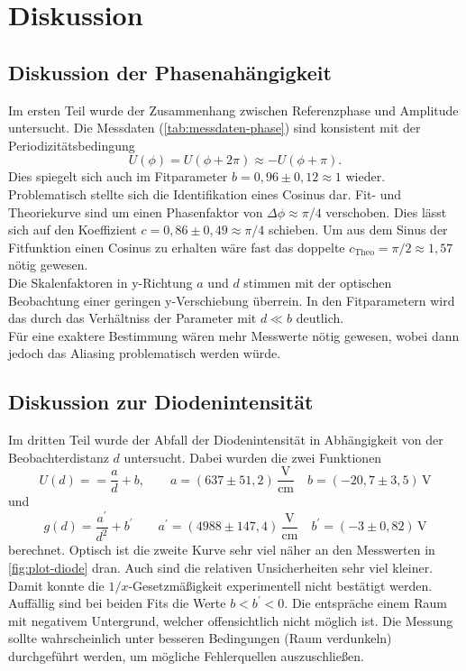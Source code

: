 \section{Diskussion}
\label{sec:Diskussion}

\subsection{Diskussion der Phasenahängigkeit}
\label{sec:Diskussion der Phasenahängigkeit}
Im ersten Teil wurde der Zusammenhang zwischen Referenzphase und Amplitude untersucht. Die
Messdaten (\autoref{tab:messdaten-phase}) sind konsistent mit der Periodizitätsbedingung
\begin{equation}
	U(\phi) = U(\phi + 2\pi) \approx -U(\phi + \pi).
\end{equation}
Dies spiegelt sich auch im Fitparameter $b = 0,96\pm0,12 \approx 1$ wieder. Problematisch
stellte sich die Identifikation eines Cosinus dar. Fit- und Theoriekurve sind um einen
Phasenfaktor von $\Delta \phi \approx \pi/4$ verschoben. Dies lässt sich auf den
Koeffizient $c = 0,86 \pm 0,49 \approx \pi / 4$ schieben. Um aus dem Sinus der
Fitfunktion einen Cosinus zu erhalten wäre fast das doppelte $c_\text{Theo} = \pi/2 \approx
1,57$ nötig gewesen.
\\
Die Skalenfaktoren in y-Richtung $a$ und $d$ stimmen mit der optischen Beobachtung einer
geringen y-Verschiebung überrein. In den Fitparametern wird das durch das
Verhältniss der Parameter mit $d \ll b$ deutlich.
\\
Für eine exaktere Bestimmung wären mehr Messwerte nötig gewesen, wobei dann jedoch das
Aliasing problematisch werden würde.

\subsection{Diskussion zur Diodenintensität}
\label{sec:Diskussion zur Diodenintensität}
Im dritten Teil wurde der Abfall der Diodenintensität in Abhängigkeit von der
Beobachterdistanz $d$ untersucht. Dabei wurden die zwei Funktionen
\begin{equation}
	U(d) = = \frac{a}{d} + b,
	\qquad
	a = (637 \pm 51,2) \, \frac{\si{\volt}}{\si{\centi\meter}}
	\quad
	b = (-20,7 \pm 3,5) \, \si{\volt}
\end{equation}
und 
\begin{equation}
	g(d) = \frac{a^\prime}{d^2} + b^\prime
	\qquad
	a^\prime = (4988 \pm 147,4) \, \frac{\si{\volt}}{\si{\centi\meter}}
	\quad
	b^\prime = (-3 \pm 0,82) \, \si{\volt}
\end{equation}
berechnet. Optisch ist die zweite Kurve sehr viel näher an den Messwerten in
\autoref{fig:plot-diode} dran. Auch sind die relativen Unsicherheiten sehr viel kleiner.
Damit konnte die $1/x$-Gesetzmäßigkeit experimentell nicht bestätigt werden.
\\
Auffällig sind bei beiden Fits die Werte $b < b^\prime < 0$. Die entspräche einem Raum mit
negativem Untergrund, welcher offensichtlich nicht möglich ist. Die Messung sollte
wahrscheinlich unter besseren Bedingungen (Raum verdunkeln) durchgeführt werden, um
mögliche Fehlerquellen auszuschließen. 

